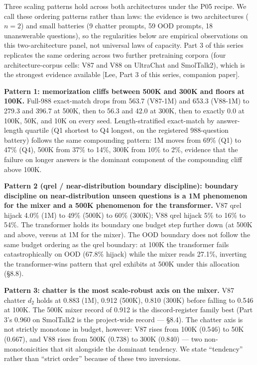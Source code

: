 \documentclass[11pt]{article}
\begin{document}
Three scaling patterns hold across both architectures under the P05 recipe. We call these ordering patterns rather than laws: the evidence is two architectures ($n = 2$) and small batteries (9 chatter prompts, 59 OOD prompts, 18 unanswerable questions), so the regularities below are empirical observations on this two-architecture panel, not universal laws of capacity. Part 3 of this series replicates the same ordering across two further pretraining corpora (four architecture-corpus cells: V87 and V88 on UltraChat and SmolTalk2), which is the strongest evidence available [Lee, Part 3 of this series, companion paper].

\textbf{Pattern 1: memorization cliffs between 500K and 300K and floors at 100K.} Full-988 exact-match drops from 563.7 (V87-1M) and 653.3 (V88-1M) to 279.3 and 396.7 at 500K, then to 56.3 and 42.0 at 300K, then to exactly 0.0 at 100K, 50K, and 10K on every seed. Length-stratified exact-match by answer-length quartile (Q1 shortest to Q4 longest, on the registered 988-question battery) follows the same compounding pattern: 1M moves from 69\% (Q1) to 47\% (Q4), 500K from 37\% to 14\%, 300K from 10\% to 2\%, evidence that the failure on longer answers is the dominant component of the compounding cliff above 100K.

\textbf{Pattern 2 (qrel / near-distribution boundary discipline): boundary discipline on near-distribution unseen questions is a 1M phenomenon for the mixer and a 500K phenomenon for the transformer.} V87 qrel hijack 4.0\% (1M) to 49\% (500K) to 60\% (300K); V88 qrel hijack 5\% to 16\% to 54\%. The transformer holds its boundary one budget step further down (at 500K and above, versus at 1M for the mixer). The OOD boundary does not follow the same budget ordering as the qrel boundary: at 100K the transformer fails catastrophically on OOD (67.8\% hijack) while the mixer reads 27.1\%, inverting the transformer-wins pattern that qrel exhibits at 500K under this allocation (\S8.8).

\textbf{Pattern 3: chatter is the most scale-robust axis on the mixer.} V87 chatter $d_2$ holds at 0.883 (1M), 0.912 (500K), 0.810 (300K) before falling to 0.546 at 100K. The 500K mixer record of 0.912 is the discord-register family best (Part 3's 0.960 on SmolTalk2 is the project-wide record --- \S8.4). The chatter axis is not strictly monotone in budget, however: V87 rises from 100K (0.546) to 50K (0.667), and V88 rises from 500K (0.738) to 300K (0.840) --- two non-monotonicities that sit alongside the dominant tendency. We state ``tendency'' rather than ``strict order'' because of these two inversions.
\end{document}
